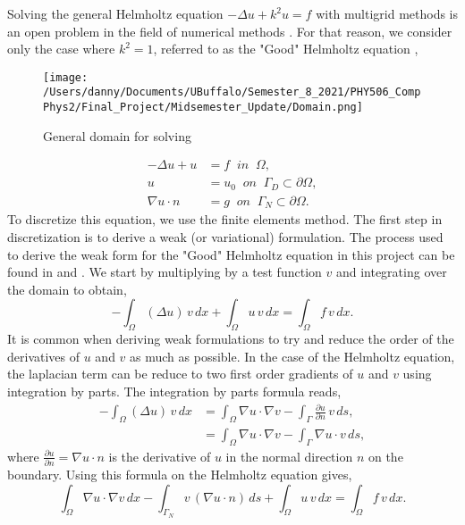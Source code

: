 \documentclass[]{article}
\begin{document}
Solving the general Helmholtz equation $-\Delta u +k^2 u = f$ with multigrid methods is an open problem in the field of numerical methods \cite{Ernst2012}.  For that reason, we consider only the case where $k^2=1$, referred to as the "Good" Helmholtz equation \cite{Farrell2018},
\begin{figure}[!ht]
\begin{center}
\texttt{[image: /Users/danny/Documents/UBuffalo/Semester\_8\_2021/PHY506\_CompPhys2/Final\_Project/Midsemester\_Update/Domain.png]}
\end{center}
\caption{General domain for solving}
\label{Domain}
\end{figure}
\begin{align}
-\Delta u + u &= f \;\; in \;\; \Omega, \\
u &= u_0 \;\; on \;\; \Gamma_D \subset \partial \Omega, \\
\nabla u\cdot n &= g \;\; on \;\; \Gamma_N \subset \partial \Omega.
\label{pde}
\end{align}
To discretize this equation, we use the finite elements method.  The first step in discretization is to derive a weak (or variational) formulation.  The process used to derive the weak form for the "Good" Helmholtz equation in this project can be found in \cite{AutomatedFEM2011} and \cite{Fenics2017}.  We start by multiplying by a test function $v$ and integrating over the domain to obtain,
\begin{equation}
-\int_{\Omega} (\Delta u) \, v \, dx + \int_{\Omega} u \, v \, dx = \int_{\Omega} f \, v \, dx.
\end{equation}
It is common when deriving weak formulations to try and reduce the order of the derivatives of $u$ and $v$ as much as possible.  In the case of the Helmholtz equation, the laplacian term can be reduce to two first order gradients of $u$ and $v$ using integration by parts.  The integration by parts formula reads,
\begin{align}
-\int_\Omega (\Delta u) \, v \, dx &= \int_\Omega \nabla u \cdot \nabla v - \int_{\Gamma} \frac{\partial u}{\partial n} \, v \, ds, \\
 &= \int_\Omega \nabla u \cdot \nabla v - \int_{\Gamma} \nabla u \cdot v \, ds,
\end{align}
where $\frac{\partial u}{\partial n} = \nabla u \cdot n$ is the derivative of $u$ in the normal direction $n$ on the boundary.  Using this formula on the Helmholtz equation gives, 
\begin{equation}
\int_{\Omega} \nabla u \cdot \nabla v \, dx - \int_{\Gamma_N} v \, (\nabla u \cdot n) \, ds + \int_{\Omega} u \, v \, dx = \int_{\Omega} f \, v \, dx.
\end{equation}
\end{document}
